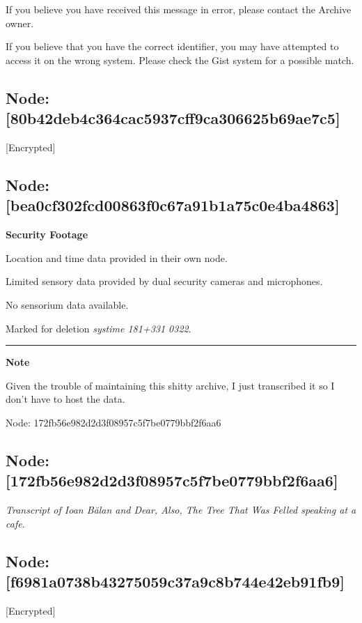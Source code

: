If you believe you have received this message in error, please contact the Archive owner.

If you believe that you have the correct identifier, you may have attempted to access it on the wrong system. Please check the Gist system for a possible match.

\hypertarget{node-80b42deb4c364cac5937cff9ca306625b69ae7c5}{%
\subsection{Node: {[}80b42deb4c364cac5937cff9ca306625b69ae7c5{]}}\label{node-80b42deb4c364cac5937cff9ca306625b69ae7c5}}

{[}Encrypted{]}

\hypertarget{node-bea0cf302fcd00863f0c67a91b1a75c0e4ba4863}{%
\subsection{Node: {[}bea0cf302fcd00863f0c67a91b1a75c0e4ba4863{]}}\label{node-bea0cf302fcd00863f0c67a91b1a75c0e4ba4863}}

\textbf{Security Footage}

Location and time data provided in their own node.

Limited sensory data provided by dual security cameras and microphones.

No sensorium data available.

Marked for deletion \emph{systime 181+331 0322}.

\begin{center}\rule{0.5\linewidth}{\linethickness}\end{center}

\textbf{Note}

Given the trouble of maintaining this shitty archive, I just transcribed it so I don't have to host the data.

Node: 172fb56e982d2d3f08957c5f7be0779bbf2f6aa6

\hypertarget{node-172fb56e982d2d3f08957c5f7be0779bbf2f6aa6}{%
\subsection{Node: {[}172fb56e982d2d3f08957c5f7be0779bbf2f6aa6{]}}\label{node-172fb56e982d2d3f08957c5f7be0779bbf2f6aa6}}

\emph{Transcript of Ioan Bălan and Dear, Also, The Tree That Was Felled speaking at a cafe.}

\hypertarget{node-f6981a0738b43275059c37a9c8b744e42eb91fb9}{%
\subsection{Node: {[}f6981a0738b43275059c37a9c8b744e42eb91fb9{]}}\label{node-f6981a0738b43275059c37a9c8b744e42eb91fb9}}

{[}Encrypted{]}

